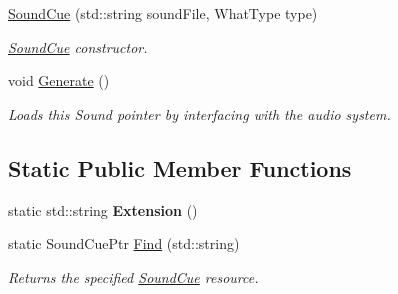 \begin{DoxyCompactItemize}
\item 
\hypertarget{classDCEngine_1_1SoundCue_a56e5b51227528be7eea916cf75f19f93}{\hyperlink{classDCEngine_1_1SoundCue_a56e5b51227528be7eea916cf75f19f93}{Sound\-Cue} (std\-::string sound\-File, What\-Type type)}\label{classDCEngine_1_1SoundCue_a56e5b51227528be7eea916cf75f19f93}

\begin{DoxyCompactList}\small\item\em \hyperlink{classDCEngine_1_1SoundCue}{Sound\-Cue} constructor. \end{DoxyCompactList}\item 
\hypertarget{classDCEngine_1_1SoundCue_abb049f82fa2457c82a9d63d5be30f23a}{void \hyperlink{classDCEngine_1_1SoundCue_abb049f82fa2457c82a9d63d5be30f23a}{Generate} ()}\label{classDCEngine_1_1SoundCue_abb049f82fa2457c82a9d63d5be30f23a}

\begin{DoxyCompactList}\small\item\em Loads this Sound pointer by interfacing with the audio system. \end{DoxyCompactList}\end{DoxyCompactItemize}
\subsection*{Static Public Member Functions}
\begin{DoxyCompactItemize}
\item 
\hypertarget{classDCEngine_1_1SoundCue_a57c92c8d1118946240165d2b5d53a57b}{static std\-::string {\bfseries Extension} ()}\label{classDCEngine_1_1SoundCue_a57c92c8d1118946240165d2b5d53a57b}

\item 
static Sound\-Cue\-Ptr \hyperlink{classDCEngine_1_1SoundCue_a023a76d96d9a6a383fa12d5e3d0e97f5}{Find} (std\-::string)
\begin{DoxyCompactList}\small\item\em Returns the specified \hyperlink{classDCEngine_1_1SoundCue}{Sound\-Cue} resource. \end{DoxyCompactList}\end{DoxyCompactItemize}
